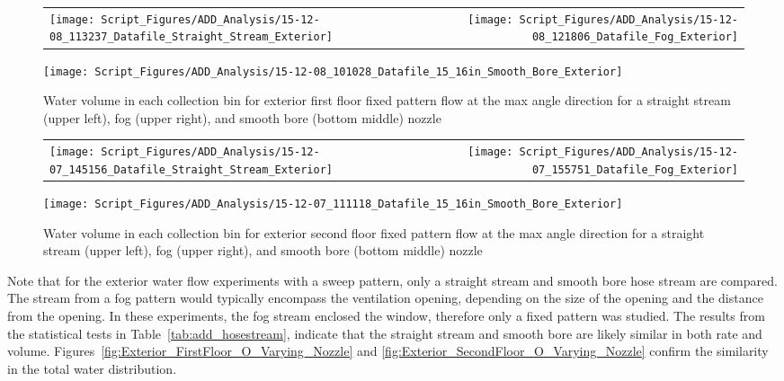 \documentclass{article}
\begin{document}
\begin{figure}[ht]
\begin{tabular*}{\textwidth}{lr}
\texttt{[image: Script\_Figures/ADD\_Analysis/15-12-08\_113237\_Datafile\_Straight\_Stream\_Exterior]} &
\texttt{[image: Script\_Figures/ADD\_Analysis/15-12-08\_121806\_Datafile\_Fog\_Exterior]} \\
\end{tabular*}
\centering
\texttt{[image: Script\_Figures/ADD\_Analysis/15-12-08\_101028\_Datafile\_15\_16in\_Smooth\_Bore\_Exterior]}
\caption{Water volume in each collection bin for exterior first floor fixed pattern flow at the max angle direction for a straight stream (upper left), fog (upper right), and smooth bore (bottom middle) nozzle}
\label{fig:Exterior_FirstFloor_Fixed_Varying_Nozzle}
\end{figure}

\begin{figure}[ht]
\begin{tabular*}{\textwidth}{lr}
\texttt{[image: Script\_Figures/ADD\_Analysis/15-12-07\_145156\_Datafile\_Straight\_Stream\_Exterior]} &
\texttt{[image: Script\_Figures/ADD\_Analysis/15-12-07\_155751\_Datafile\_Fog\_Exterior]} \\
\end{tabular*}
\centering
\texttt{[image: Script\_Figures/ADD\_Analysis/15-12-07\_111118\_Datafile\_15\_16in\_Smooth\_Bore\_Exterior]}
\caption{Water volume in each collection bin for exterior second floor fixed pattern flow at the max angle direction for a straight stream (upper left), fog (upper right), and smooth bore (bottom middle) nozzle}
\label{fig:Exterior_SecondFloor_Fixed_Varying_Nozzle}
\end{figure}

\clearpage

Note that for the exterior water flow experiments with a sweep pattern, only a straight stream and smooth bore hose stream are compared. The stream from a fog pattern would typically encompass the ventilation opening, depending on the size of the opening and the distance from the opening. In these experiments, the fog stream enclosed the window, therefore only a fixed pattern was studied. The results from the statistical tests in Table~\ref{tab:add_hosestream}, indicate that the straight stream and smooth bore are likely similar in both rate and volume. Figures~\ref{fig:Exterior_FirstFloor_O_Varying_Nozzle} and \ref{fig:Exterior_SecondFloor_O_Varying_Nozzle} confirm the similarity in the total water distribution.
\end{document}
